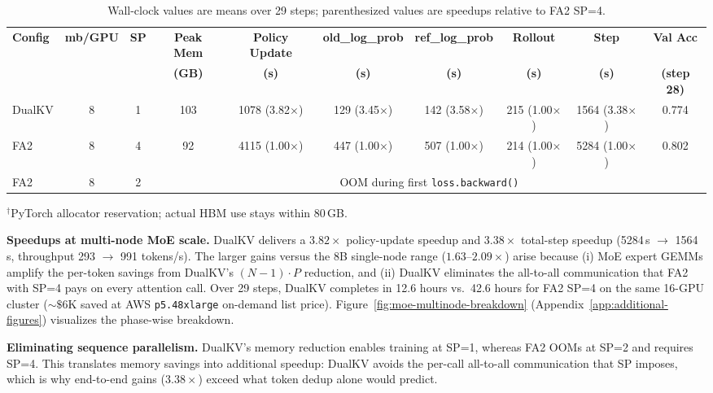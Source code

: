 \documentclass{article}
\begin{document}
\begin{table}[ht]
\centering
\scriptsize
\setlength{\tabcolsep}{4pt}
\caption{Wall-clock values are means over 29 steps; parenthesized values are speedups relative to FA2 SP=4.}
\label{tab:e2e-moe-multinode}
\begin{tabular}{@{}lc c c c c c c c c@{}}
\toprule
\textbf{Config} & \textbf{mb/GPU} & \textbf{SP} & \textbf{Peak Mem} & \textbf{Policy Update} & \textbf{old\_log\_prob} & \textbf{ref\_log\_prob} & \textbf{Rollout} & \textbf{Step} & \textbf{Val Acc} \\
 & & & \textbf{(GB)} & \textbf{(s)} & \textbf{(s)} & \textbf{(s)} & \textbf{(s)} & \textbf{(s)} & \textbf{(step 28)} \\
\midrule
DualKV  & 8 & 1 & 103\rlap{$^\dagger$} & 1078 (3.82$\times$) & 129 (3.45$\times$) & 142 (3.58$\times$) & 215 (1.00$\times$) & 1564 (3.38$\times$) & 0.774 \\
FA2     & 8 & 4 &  92\rlap{$^\dagger$} & 4115 (1.00$\times$) & 447 (1.00$\times$) & 507 (1.00$\times$) & 214 (1.00$\times$) & 5284 (1.00$\times$) & 0.802 \\
FA2     & 8 & 2 & \multicolumn{7}{c}{OOM during first \texttt{loss.backward()}} \\
\bottomrule
\end{tabular}
\vspace{2pt}

{\scriptsize $^\dagger$PyTorch allocator reservation; actual HBM use stays within 80\,GB.}
\end{table}

\textbf{Speedups at multi-node MoE scale.}
DualKV delivers a $3.82\times$ policy-update speedup and $3.38\times$ total-step speedup (5284\,s $\to$ 1564\,s, throughput 293 $\to$ 991 tokens/s). The larger gains versus the 8B single-node range ($1.63$--$2.09\times$) arise because (i) MoE expert GEMMs amplify the per-token savings from DualKV's $(N{-}1) \cdot P$ reduction, and (ii) DualKV eliminates the all-to-all communication that FA2 with SP=4 pays on every attention call. Over 29 steps, DualKV completes in 12.6 hours vs.\ 42.6 hours for FA2 SP=4 on the same 16-GPU cluster (${\sim}\$6$K saved at AWS \texttt{p5.48xlarge} on-demand list price). Figure~\ref{fig:moe-multinode-breakdown} (Appendix~\ref{app:additional-figures}) visualizes the phase-wise breakdown.

\textbf{Eliminating sequence parallelism.} DualKV's memory reduction enables training at SP=1, whereas FA2 OOMs at SP=2 and requires SP=4. This translates memory savings into additional speedup: DualKV avoids the per-call all-to-all communication that SP imposes, which is why end-to-end gains ($3.38\times$) exceed what token dedup alone would predict.
\end{document}
